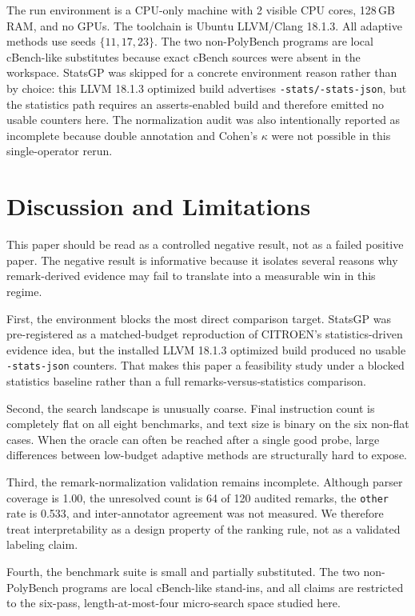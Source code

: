 \documentclass{article}
\begin{document}
The run environment is a CPU-only machine with 2 visible CPU cores, 128\,GB RAM, and no GPUs. The toolchain is Ubuntu LLVM/Clang 18.1.3. All adaptive methods use seeds $\{11,17,23\}$. The two non-PolyBench programs are local cBench-like substitutes because exact cBench sources were absent in the workspace. StatsGP was skipped for a concrete environment reason rather than by choice: this LLVM 18.1.3 optimized build advertises \texttt{-stats/-stats-json}, but the statistics path requires an asserts-enabled build and therefore emitted no usable counters here. The normalization audit was also intentionally reported as incomplete because double annotation and Cohen's $\kappa$ were not possible in this single-operator rerun.

\section{Discussion and Limitations}
\label{sec:discussion}

This paper should be read as a controlled negative result, not as a failed positive paper. The negative result is informative because it isolates several reasons why remark-derived evidence may fail to translate into a measurable win in this regime.

First, the environment blocks the most direct comparison target. StatsGP was pre-registered as a matched-budget reproduction of CITROEN's statistics-driven evidence idea, but the installed LLVM 18.1.3 optimized build produced no usable \texttt{-stats-json} counters. That makes this paper a feasibility study under a blocked statistics baseline rather than a full remarks-versus-statistics comparison.

Second, the search landscape is unusually coarse. Final instruction count is completely flat on all eight benchmarks, and text size is binary on the six non-flat cases. When the oracle can often be reached after a single good probe, large differences between low-budget adaptive methods are structurally hard to expose.

Third, the remark-normalization validation remains incomplete. Although parser coverage is 1.00, the unresolved count is 64 of 120 audited remarks, the \texttt{other} rate is 0.533, and inter-annotator agreement was not measured. We therefore treat interpretability as a design property of the ranking rule, not as a validated labeling claim.

Fourth, the benchmark suite is small and partially substituted. The two non-PolyBench programs are local cBench-like stand-ins, and all claims are restricted to the six-pass, length-at-most-four micro-search space studied here.
\end{document}
